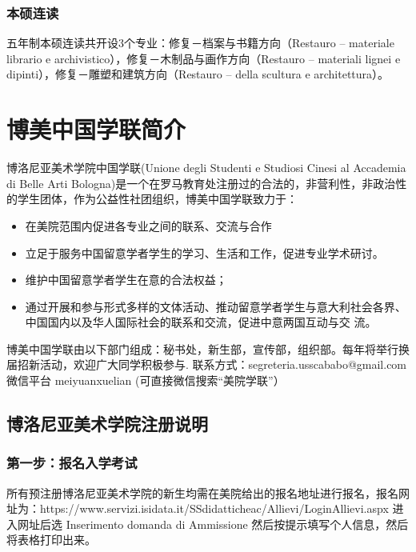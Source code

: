 \subsubsection{本硕连读}
五年制本硕连读共开设3个专业：修复－档案与书籍方向（Restauro – materiale librario e archivistico），修复－木制品与画作方向（Restauro – materiali lignei e dipinti），修复－雕塑和建筑方向（Restauro – della scultura e architettura）。


\section{博美中国学联简介}

博洛尼亚美术学院中国学联(Unione degli Studenti e Studiosi Cinesi al Accademia di Belle Arti Bologna)是一个在罗马教育处注册过的合法的，非营利性，非政治性的学生团体，作为公益性社团组织，博美中国学联致力于：
\begin{itemize}
\item 在美院范围内促进各专业之间的联系、交流与合作
\item 立足于服务中国留意学者学生的学习、生活和工作，促进专业学术研讨。
\item 维护中国留意学者学生在意的合法权益；
\item 通过开展和参与形式多样的文体活动、推动留意学者学生与意大利社会各界、中国国内以及华人国际社会的联系和交流，促进中意两国互动与交 流。
\end{itemize}

博美中国学联由以下部门组成：秘书处，新生部，宣传部，组织部。每年将举行换届招新活动，欢迎广大同学积极参与.
联系方式：segreteria.usscababo@gmail.com
微信平台  meiyuanxuelian (可直接微信搜索“美院学联”）

\subsection{博洛尼亚美术学院注册说明}
\subsubsection{第一步：报名入学考试}
所有预注册博洛尼亚美术学院的新生均需在美院给出的报名地址进行报名，报名网址为：https://www.servizi.isidata.it/SSdidatticheac/Allievi/LoginAllievi.aspx 进入网址后选 Inserimento domanda di Ammissione 然后按提示填写个人信息，然后将表格打印出来。


